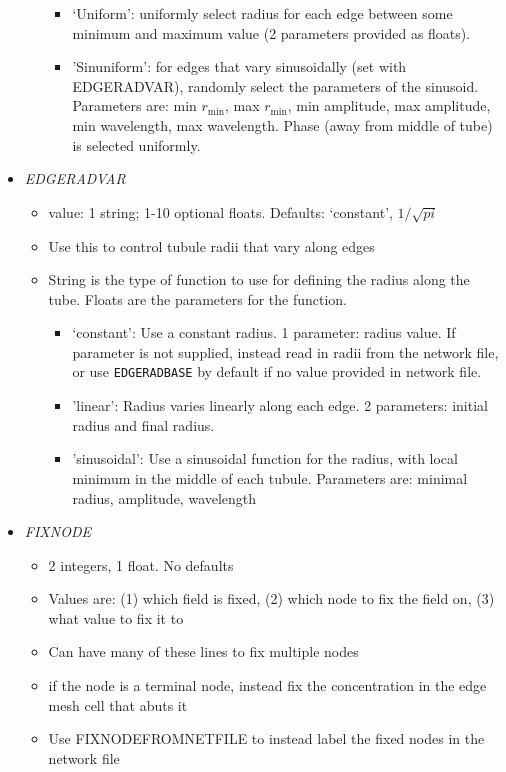 \documentclass[12pt]{article}
\begin{document}
\begin{itemize}
\begin{itemize}
\begin{itemize}
		\item `Uniform': uniformly select radius for each edge between some minimum and maximum value (2 parameters provided as floats).
		\item 'Sinuniform': for edges that vary sinusoidally (set with EDGERADVAR), randomly select the parameters of the sinusoid. Parameters are: min $r_\text{min}$, max $r_\text{min}$, min amplitude, max amplitude, min wavelength, max wavelength. Phase (away from middle of tube) is selected uniformly. 
	\end{itemize}
\end{itemize}
%
\item {\it EDGERADVAR}
\begin{itemize}
	\item  value: 1 string; 1-10 optional floats. Defaults: `constant', $1/\sqrt{pi}$
	\item Use this to control tubule radii that vary along edges
	\item String is the type of function to use for defining the radius along the tube. Floats are the parameters for the function.
	\begin{itemize}
		\item `constant': Use a constant radius. 1 parameter: radius value. If parameter is not supplied, instead read in radii from the network file, or use \verb=EDGERADBASE= by default if no value provided in network file.
		\item 'linear': Radius varies linearly along each edge. 2 parameters: initial radius and final radius.
		\item 'sinusoidal': Use a sinusoidal function for the radius, with local minimum in the middle of each tubule. Parameters are: minimal radius, amplitude, wavelength
	\end{itemize}
\end{itemize}
%
\item {\it FIXNODE}
\begin{itemize}
	\item 2 integers, 1 float. No defaults
	\item Values are: (1) which field is fixed, (2) which node to fix the field on, (3) what value to fix it to
	\item Can have many of these lines to fix multiple nodes
	\item if the node is a terminal node, instead fix the concentration in the edge mesh cell that abuts it
	\item Use FIXNODEFROMNETFILE to instead label the fixed nodes in the network file

\end{itemize}
\end{itemize}
\end{document}
